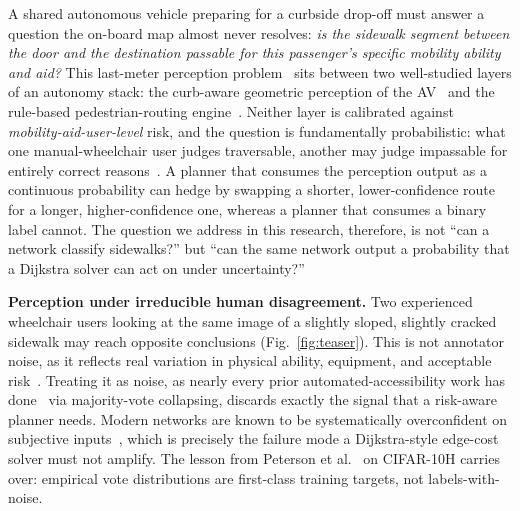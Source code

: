 \documentclass[conference]{IEEEtran}
\begin{document}
A shared autonomous vehicle preparing for a curbside drop-off must answer a question the on-board map almost never resolves: \emph{is the sidewalk segment between the door and the destination passable for this passenger's specific mobility ability and aid?} This last-meter perception problem~\cite{bolten2017accessmap,saha2022mypath,tannert2018wheelchair} sits between two well-studied layers of an autonomy stack: the curb-aware geometric perception of the AV~\cite{Saha_ProjectSidewalk_CHI2019,o'meara2025rampnet,hosseini2023tile2net} and the rule-based pedestrian-routing engine~\cite{openrouteservice2026wheelchair,bolten2019opensidewalks}. Neither layer is calibrated against \emph{mobility-aid-user-level} risk, and the question is fundamentally probabilistic: what one manual-wheelchair user judges traversable, another may judge impassable for entirely correct reasons~\cite{DBLP:journals/corr/abs-2502-19888}. A planner that consumes the perception output as a continuous probability can hedge by swapping a shorter, lower-confidence route for a longer, higher-confidence one, whereas a planner that consumes a binary label cannot. The question we address in this research, therefore, is not ``can a network classify sidewalks?'' but ``can the same network output a probability that a Dijkstra solver can act on under uncertainty?''

\textbf{Perception under irreducible human disagreement.} Two experienced wheelchair users looking at the same image of a slightly sloped, slightly cracked sidewalk may reach opposite conclusions (Fig.~\ref{fig:teaser}). This is not annotator noise, as it reflects real variation in physical ability, equipment, and acceptable risk~\cite{DBLP:journals/corr/abs-2502-19888,collins2022elicit}. Treating it as noise, as nearly every prior automated-accessibility work has done~\cite{10.1145/3308561.3353798,o'meara2025rampnet,10.1145/3663548.3688531,hosseini2022citysurfaces} via majority-vote collapsing, discards exactly the signal that a risk-aware planner needs. Modern networks are known to be systematically overconfident on subjective inputs~\cite{guo2017calibration,minderer2021revisiting,jiang2024crowdcalibrator}, which is precisely the failure mode a Dijkstra-style edge-cost solver must not amplify. The lesson from Peterson et al.~\cite{peterson2019humanuncertainty} on CIFAR-10H carries over: empirical vote distributions are first-class training targets, not labels-with-noise.
\end{document}

